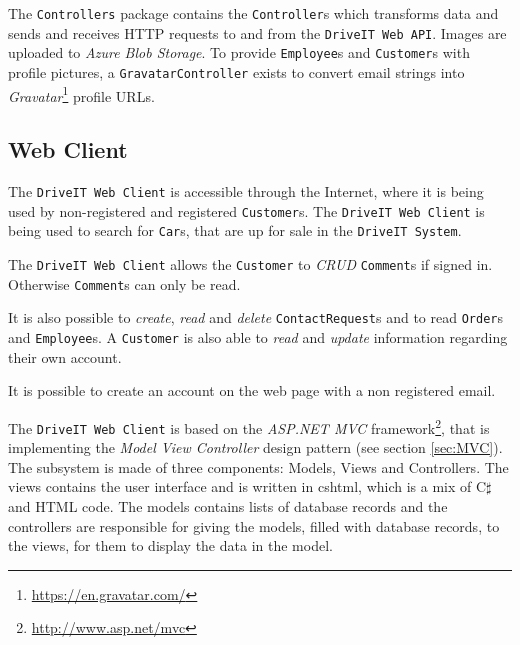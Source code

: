 The \texttt{Controllers} package contains the \texttt{Controller}s which transforms data and sends and receives HTTP requests to and from the \texttt{DriveIT Web API}. Images are uploaded to \textit{Azure Blob Storage}. To provide \texttt{Employee}s and \texttt{Customer}s with profile pictures, a \texttt{GravatarController} exists to convert email strings into \textit{Gravatar}\footnote{\url{https://en.gravatar.com/}} profile URLs.

\subsection{Web Client}
The \texttt{DriveIT Web Client} is accessible through the Internet, where it is being used by non-registered and registered \texttt{Customer}s. The \texttt{DriveIT Web Client} is being used to search for \texttt{Car}s, that are up for sale in the \texttt{DriveIT System}.

The \texttt{DriveIT Web Client} allows the \texttt{Customer} to \textit{CRUD} \texttt{Comment}s if signed in. Otherwise \texttt{Comment}s can only be read.

It is also possible to \textit{create}, \textit{read} and \textit{delete} \texttt{ContactRequest}s and to read \texttt{Order}s and \texttt{Employee}s. A \texttt{Customer} is also able to \textit{read} and \textit{update} information regarding their own account.

It is possible to create an account on the web page with a non registered email.

The \texttt{DriveIT Web Client} is based on the \textit{ASP.NET MVC} framework\footnote{\url{http://www.asp.net/mvc}}, that is implementing the \textit{Model View Controller} design pattern (see section \ref{sec:MVC}). The subsystem is made of three components: Models, Views and Controllers. The views contains the user interface and is written in cshtml, which is a mix of C$\sharp$ and HTML code. The models contains lists of database records and the controllers are responsible for giving the models, filled with database records, to the views, for them to display the data in the model.

